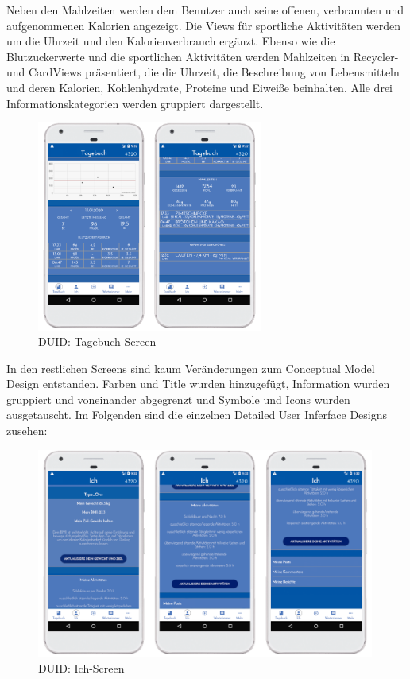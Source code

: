 	Neben den Mahlzeiten werden dem Benutzer auch seine offenen, verbrannten und aufgenommenen Kalorien angezeigt. Die Views für sportliche Aktivitäten werden um die Uhrzeit und den Kalorienverbrauch ergänzt.\newline
	Ebenso wie die Blutzuckerwerte und die sportlichen Aktivitäten werden Mahlzeiten in Recycler- und CardViews präsentiert, die die Uhrzeit, die Beschreibung von Lebensmitteln und deren Kalorien, Kohlenhydrate, Proteine und Eiweiße beinhalten. Alle drei Informationskategorien werden gruppiert dargestellt.

\begin{figure}[H]
	\centering
	\includegraphics[width=0.66\textwidth]{images/tagebuchscreen_digital.png}
	\captionsetup{justification=centering}
	\caption{DUID: Tagebuch-Screen}
	\label{img:DUIDtagebuchscreen}
\end{figure}
In den restlichen Screens sind kaum Veränderungen zum Conceptual Model Design entstanden. Farben und Title wurden hinzugefügt, Information wurden gruppiert und voneinander abgegrenzt und Symbole und Icons wurden ausgetauscht. Im Folgenden sind die einzelnen Detailed User Inferface Designs zusehen:\\
\begin{figure}[H]
	\centering
	\includegraphics[width=0.99\textwidth]{images/ichscreen_digital.png}
	\captionsetup{justification=centering}
	\caption{DUID: Ich-Screen}
	\label{img:DUIDichscreen}
\end{figure}
